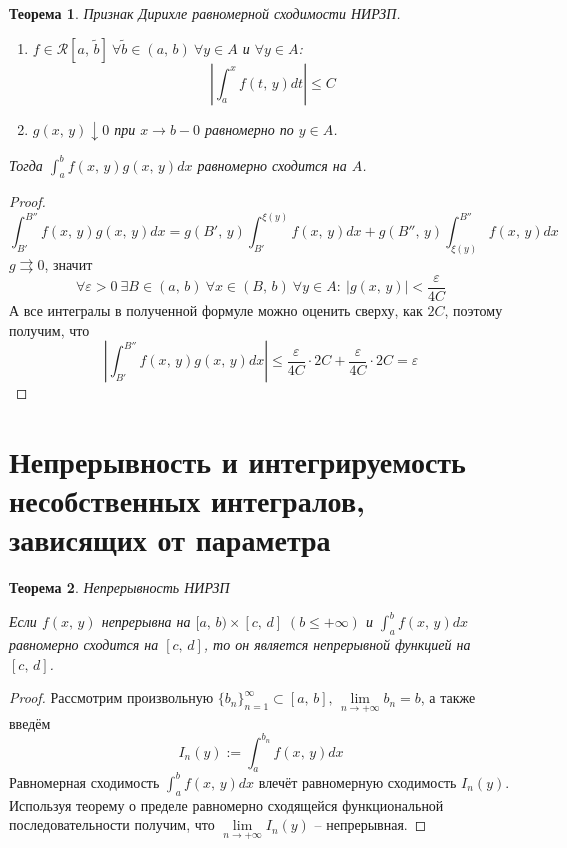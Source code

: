 \documentclass[a4paper,12pt]{article}
\renewcommand{\leq}{\ensuremath{\leqslant}}
\theoremstyle{plain}
\newtheorem{theorem}{Теорема}[section]
\theoremstyle{definition}
\theoremstyle{remark}
\begin{document}
\begin{theorem}
	Признак Дирихле равномерной сходимости НИРЗП.

	\begin{enumerate}
		\item $f \in \mathcal{R}[a,\,\tilde{b}]\:\forall \tilde{b} \in (a,\,b) \: \forall y \in A$ и $\forall y \in A$:
		      \[\left|\int_a^x f(t,\,y)dt\right| \leq C\]
		\item $g(x,\,y) \downarrow 0$ при $x \to b - 0$ равномерно по $y \in A$.
	\end{enumerate}
	Тогда $\int_a^b f(x,\,y)g(x,\,y)dx$ равномерно сходится на $A$.
\end{theorem}
\begin{proof}
	\[\int_{B'}^{B''}f(x,\,y)g(x,\,y)dx = g(B',\,y)\int_{B'}^{\xi(y)}f(x,\,y)dx + g(B'',\,y)\int_{\xi(y)}^{B''}f(x,\,y)dx\]
	$g \rightrightarrows 0$, значит
	\[\forall \varepsilon > 0 \: \exists B \in (a,\,b) \: \forall x \in (B,\,b) \: \forall y \in A :\: |g(x,\,y)| < \frac{\varepsilon}{4C}\]
	А все интегралы в полученной формуле можно оценить сверху, как $2C$, поэтому получим, что
	\[\left|\int_{B'}^{B''}f(x,\,y)g(x,\,y)dx\right| \leq \frac{\varepsilon}{4C}\cdot 2C + \frac{\varepsilon}{4C}\cdot 2C = \varepsilon\]
\end{proof}

\section{Непрерывность и интегрируемость несобственных интегралов, зависящих от параметра}
\begin{theorem}
	Непрерывность НИРЗП

	Если $f(x,\,y)$ непрерывна на $[a,\,b) \times [c,\,d]\; (b \leq +\infty)$ и $\int_a^bf(x,\,y)dx$ равномерно сходится на $[c,\,d]$, то он является непрерывной функцией на $[c,\,d]$.
\end{theorem}
\begin{proof}
	Рассмотрим произвольную $\{b_n\}_{n = 1}^\infty \subset [a,\,b],\,\lim\limits_{n \to +\infty}b_n = b$, а также введём
	\[I_n(y) := \int_a^{b_n}f(x,\,y)dx\]
	Равномерная сходимость $\int_a^bf(x,\,y)dx$ влечёт равномерную сходимость $I_n(y)$. Используя теорему о пределе равномерно сходящейся функциональной последовательности получим, что $\lim\limits_{n \to +\infty} I_n(y)$ -- непрерывная.
\end{proof}
\end{document}
